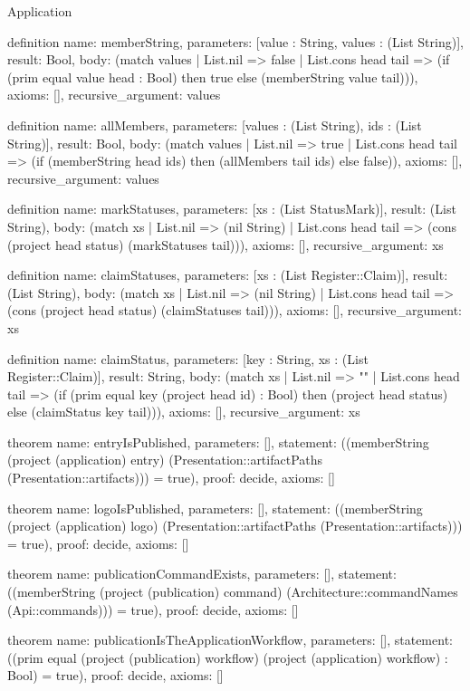 \begin{lexlean}{Application}
\begin{semanticmodule}
definition{
  name: memberString,
  parameters: [value : String, values : (List String)],
  result: Bool,
  body: (match values
    | List.nil => false
    | List.cons head tail => (if (prim equal value head : Bool) then true else (memberString value tail))),
  axioms: [],
  recursive_argument: values
}

definition{
  name: allMembers,
  parameters: [values : (List String), ids : (List String)],
  result: Bool,
  body: (match values
    | List.nil => true
    | List.cons head tail => (if (memberString head ids) then (allMembers tail ids) else false)),
  axioms: [],
  recursive_argument: values
}

definition{
  name: markStatuses,
  parameters: [xs : (List StatusMark)],
  result: (List String),
  body: (match xs
    | List.nil => (nil String)
    | List.cons head tail => (cons (project head status) (markStatuses tail))),
  axioms: [],
  recursive_argument: xs
}

definition{
  name: claimStatuses,
  parameters: [xs : (List Register::Claim)],
  result: (List String),
  body: (match xs
    | List.nil => (nil String)
    | List.cons head tail => (cons (project head status) (claimStatuses tail))),
  axioms: [],
  recursive_argument: xs
}

definition{
  name: claimStatus,
  parameters: [key : String, xs : (List Register::Claim)],
  result: String,
  body: (match xs
    | List.nil => ""
    | List.cons head tail => (if (prim equal key (project head id) : Bool) then (project head status) else (claimStatus key tail))),
  axioms: [],
  recursive_argument: xs
}

theorem{
  name: entryIsPublished,
  parameters: [],
  statement: ((memberString (project (application) entry) (Presentation::artifactPaths (Presentation::artifacts))) = true),
  proof: decide{},
  axioms: []
}

theorem{
  name: logoIsPublished,
  parameters: [],
  statement: ((memberString (project (application) logo) (Presentation::artifactPaths (Presentation::artifacts))) = true),
  proof: decide{},
  axioms: []
}

theorem{
  name: publicationCommandExists,
  parameters: [],
  statement: ((memberString (project (publication) command) (Architecture::commandNames (Api::commands))) = true),
  proof: decide{},
  axioms: []
}

theorem{
  name: publicationIsTheApplicationWorkflow,
  parameters: [],
  statement: ((prim equal (project (publication) workflow) (project (application) workflow) : Bool) = true),
  proof: decide{},
  axioms: []
}


\end{semanticmodule}
\end{lexlean}
